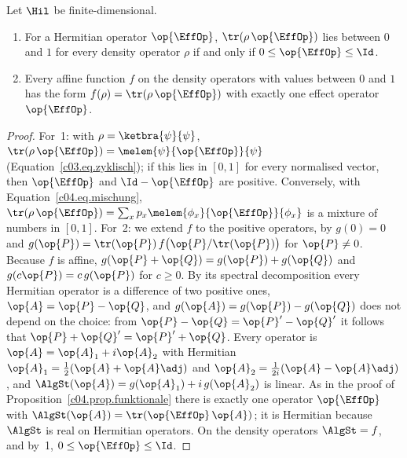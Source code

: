 \begin{proposition}\label{c04.prop.effekte}
  Let $\Hil$ be finite-dimensional.
  \begin{enumerate}
    \item For a Hermitian operator $\op{\EffOp}$, $\tr(\rho\,\op{\EffOp})$ lies between $0$ and $1$
      for every density operator $\rho$ if and only if $0 \leq \op{\EffOp} \leq \Id$.
    \item Every affine function $f$ on the density operators with values between $0$ and $1$ has
      the form $f(\rho) = \tr(\rho\,\op{\EffOp})$ with exactly one effect operator $\op{\EffOp}$.
  \end{enumerate}
\end{proposition}
\begin{proof}
  For~1: with $\rho = \ketbra{\psi}{\psi}$, $\tr(\rho\,\op{\EffOp}) = \melem{\psi}{\op{\EffOp}}{\psi}$
  (Equation~\eqref{c03.eq.zyklisch}); if this lies in $[0, 1]$ for every normalised vector, then
  $\op{\EffOp}$ and $\Id - \op{\EffOp}$ are positive. Conversely, with
  Equation~\eqref{c04.eq.mischung},
  $\tr(\rho\,\op{\EffOp}) = \sum_x p_x \melem{\phi_x}{\op{\EffOp}}{\phi_x}$ is a mixture of numbers
  in $[0, 1]$. For~2: we extend $f$ to the positive operators, by $g(0) = 0$ and
  $g(\op{P}) = \tr(\op{P})\, f\bigl(\op{P}/\tr(\op{P})\bigr)$ for $\op{P} \neq 0$. Because $f$ is
  affine, $g(\op{P} + \op{Q}) = g(\op{P}) + g(\op{Q})$ and $g(c\op{P}) = c\, g(\op{P})$ for
  $c \geq 0$. By its spectral decomposition every Hermitian operator is a difference of two positive
  ones, $\op{A} = \op{P} - \op{Q}$, and $g(\op{A}) = g(\op{P}) - g(\op{Q})$ does not depend on the
  choice: from $\op{P} - \op{Q} = \op{P}' - \op{Q}'$ it follows that
  $\op{P} + \op{Q}' = \op{P}' + \op{Q}$. Every operator is $\op{A} = \op{A}_1 + i\op{A}_2$ with
  Hermitian $\op{A}_1 = \tfrac12(\op{A} + \op{A}\adj)$ and
  $\op{A}_2 = \tfrac{1}{2i}(\op{A} - \op{A}\adj)$, and $\AlgSt(\op{A}) = g(\op{A}_1) + i\,g(\op{A}_2)$
  is linear. As in the proof of Proposition~\ref{c04.prop.funktionale} there is exactly one operator
  $\op{\EffOp}$ with $\AlgSt(\op{A}) = \tr(\op{\EffOp}\,\op{A})$; it is Hermitian because $\AlgSt$
  is real on Hermitian operators. On the density operators $\AlgSt = f$, and by~1,
  $0 \leq \op{\EffOp} \leq \Id$.
\end{proof}


